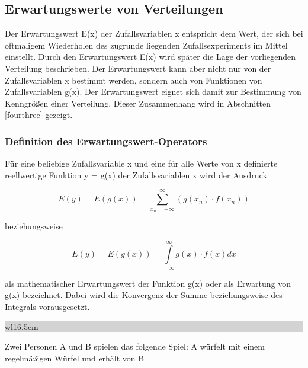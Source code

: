 \clearpage

\subsection{Erwartungswerte von Verteilungen}

\noindent Der Erwartungswert E(x) der Zufallsvariablen x entspricht dem Wert, der sich bei oftmaligem Wiederholen des zugrunde liegenden Zufallsexperiments im Mittel einstellt. Durch den Erwartungswert E(x) wird sp\"{a}ter die Lage der vorliegenden Verteilung beschrieben. Der Erwartungswert kann aber nicht nur von der Zufallsvariablen x bestimmt werden, sondern auch von Funktionen von Zufallsvariablen g(x). Der Erwartungswert eignet sich damit zur Bestimmung von Kenngr\"{o}{\ss}en einer Verteilung. Dieser Zusammenhang wird in Abschnitten \ref{fourthree} gezeigt.


\subsubsection{Definition des Erwartungswert-Operators}

\noindent F\"{u}r eine beliebige Zufallsvariable x und eine f\"{u}r alle Werte von x definierte reellwertige Funktion y = g(x) der Zufallsvariablen x wird der Ausdruck 

\begin{equation}\label{eq:fourtwentytwo}
E(y)=E\left(g(x)\right)=\sum _{x_{n} =-\infty }^{\infty }\left(g(x_{n})\cdot f(x_{n})\right)
\end{equation}

\noindent beziehungsweise 

\begin{equation}\label{eq:fourtwentythree}
E(y)=E\left(g(x)\right)=\int\limits _{-\infty}^{\infty}g(x)\cdot f(x)dx
\end{equation}

\noindent als mathematischer Erwartungswert der Funktion g(x) oder als Erwartung von g(x) bezeichnet. Dabei wird die Konvergenz der Summe beziehungsweise des Integrals vorausgesetzt.\bigskip

\noindent
\colorbox{lightgray}{%
%
\renewcommand\arraystretch{0.6}%
\begin{tabular}{ wl{16.5cm} }
{}
\end{tabular}%
}\medskip 

\noindent Zwei Personen A und B spielen das folgende Spiel: A w\"{u}rfelt mit einem regelm\"{a}{\ss}igen W\"{u}rfel und erh\"{a}lt von B

